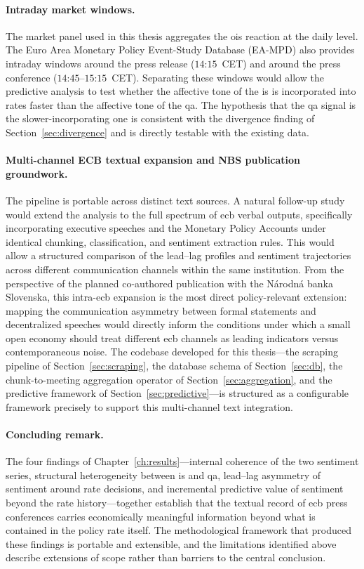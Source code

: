 \paragraph{Intraday market windows.} The market panel used in this thesis aggregates the \gls{ois} reaction at the daily level. The Euro Area Monetary Policy Event-Study Database (EA-MPD) \cite{altavilla2019measuring} also provides intraday windows around the press release ($14$:$15$~CET) and around the press conference ($14$:$45$--$15$:$15$~CET). Separating these windows would allow the predictive analysis to test whether the affective tone of the \gls{is} is incorporated into rates faster than the affective tone of the \gls{qa}. The hypothesis that the \gls{qa} signal is the slower-incorporating one is consistent with the divergence finding of Section~\ref{sec:divergence} and is directly testable with the existing data.

\paragraph{Multi-channel ECB textual expansion and NBS publication groundwork.} The pipeline is portable across distinct text sources. A natural follow-up study would extend the analysis to the full spectrum of \gls{ecb} verbal outputs, specifically incorporating executive speeches and the Monetary Policy Accounts under identical chunking, classification, and sentiment extraction rules. This would allow a structured comparison of the lead--lag profiles and sentiment trajectories across different communication channels within the same institution. From the perspective of the planned co-authored publication with the N\'{a}rodn\'{a} banka Slovenska, this intra-\gls{ecb} expansion is the most direct policy-relevant extension: mapping the communication asymmetry between formal statements and decentralized speeches would directly inform the conditions under which a small open economy should treat different \gls{ecb} channels as leading indicators versus contemporaneous noise. The codebase developed for this thesis---the scraping pipeline of Section~\ref{sec:scraping}, the database schema of Section~\ref{sec:db}, the chunk-to-meeting aggregation operator of Section~\ref{sec:aggregation}, and the predictive framework of Section~\ref{sec:predictive}---is structured as a configurable framework precisely to support this multi-channel text integration.

\paragraph{Concluding remark.} The four findings of Chapter~\ref{ch:results}---internal coherence of the two sentiment series, structural heterogeneity between \gls{is} and \gls{qa}, lead--lag asymmetry of sentiment around rate decisions, and incremental predictive value of sentiment beyond the rate history---together establish that the textual record of \gls{ecb} press conferences carries economically meaningful information beyond what is contained in the policy rate itself. The methodological framework that produced these findings is portable and extensible, and the limitations identified above describe extensions of scope rather than barriers to the central conclusion.